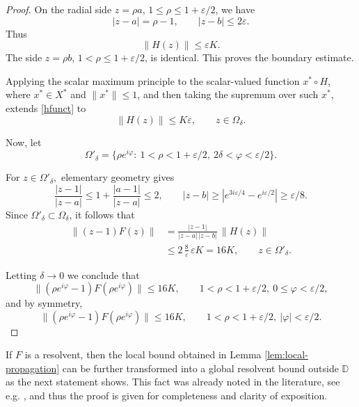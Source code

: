\documentclass[11pt]{amsart}
\numberwithin{equation}{section}
\theoremstyle{definition}
\theoremstyle{plain}
\def\D{\mathbb{D}}
\begin{document}
\begin{proof}
On the radial side \(z=\rho a\),
\(1\le \rho\le1+\varepsilon/2\), 
we have
\[
        |z-a|=\rho-1,\qquad |z-b|\le2\varepsilon.
\]
Thus
\[
        \|H(z)\|
        \le \varepsilon K.
\]
The side \(z=\rho b\), \(1< \rho\le 1+\varepsilon/2\),  is identical.  This proves the boundary
estimate.


Applying the scalar maximum principle to the scalar-valued function
\(x^*\circ H\), where \(x^*\in X^*\) and \(\|x^*\|\le1\), and then
taking the supremum over such \(x^*\), extends \eqref{hfunct} to
\[
        \|H(z)\|\le K\varepsilon,
        \qquad z\in\Omega_\delta.
\]



Now, let 
$$        
\Omega'_\delta=\{\rho e^{i\varphi}:\ 1<\rho<1+\varepsilon/2,\ 
          2\delta<\varphi<\varepsilon/2\}.
$$

For $z\in\Omega'_\delta,$ elementary geometry gives  
\[
        \frac{|z-1|}{|z-a|}\le 1+ \frac{|a-1|}{|z-a|} \le 2,
        \qquad
        |z-b|\ge |e^{3i\varepsilon/4}-e^{i\varepsilon/2}|\ge{\varepsilon/8}.
\]
Since $\Omega'_\delta\subset\Omega_\delta$, it follows that
\[
\begin{aligned}
   \|(z-1)F(z)\|
   &=
   \frac{|z-1|}{|z-a|\,|z-b|}\,\|H(z)\|  \\
   &\le
   2\,\frac{8}{\varepsilon}\,\varepsilon K
   =16K,
   \qquad z\in\Omega'_\delta.
\end{aligned}
\]

Letting $\delta\to0$ we conclude that 
$$
\|(\rho e^{i\varphi}-1)F(\rho e^{i\varphi})\|
        \le 16K,\qquad  1<\rho<1+\varepsilon/2,\ 
          0\le \varphi<\varepsilon/2,
$$
and by symmetry, 
$$
\|(\rho e^{i\varphi}-1)F(\rho e^{i\varphi})\|
        \le 16K,\qquad  1<\rho<1+\varepsilon/2,\ 
          |\varphi|<\varepsilon/2.
$$
\end{proof}


If $F$ is a resolvent, then the local bound obtained in Lemma \ref{lem:local-propagation}
can be further transformed into a global resolvent bound
outside $\D$ as the next statement shows. 
This fact was already noted in the literature,
see e.g. \cite[Theorem 2.1]{Borovykh}, and thus the proof is given for completeness and clarity of exposition.
\end{document}
